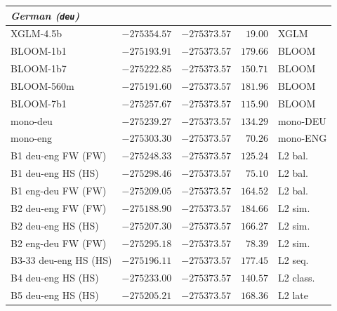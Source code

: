 \begin{table}[t]
\begin{tabular}{lrrrl}
    \midrule
    \multicolumn{5}{l}{\textit{German (\texttt{deu})}} \\
    \midrule
    XGLM-4.5b & $-275354.57$ & $-275373.57$ & $19.00$ & XGLM \\
    BLOOM-1b1 & $-275193.91$ & $-275373.57$ & $179.66$ & BLOOM \\
    BLOOM-1b7 & $-275222.85$ & $-275373.57$ & $150.71$ & BLOOM \\
    BLOOM-560m & $-275191.60$ & $-275373.57$ & $181.96$ & BLOOM \\
    BLOOM-7b1 & $-275257.67$ & $-275373.57$ & $115.90$ & BLOOM \\
    mono-deu & $-275239.27$ & $-275373.57$ & $134.29$ & mono-DEU \\
    mono-eng & $-275303.30$ & $-275373.57$ & $70.26$ & mono-ENG \\
    B1 deu-eng FW (FW) & $-275248.33$ & $-275373.57$ & $125.24$ & L2 bal. \\
    B1 deu-eng HS (HS) & $-275298.46$ & $-275373.57$ & $75.10$ & L2 bal. \\
    B1 eng-deu FW (FW) & $-275209.05$ & $-275373.57$ & $164.52$ & L2 bal. \\
    B2 deu-eng FW (FW) & $-275188.90$ & $-275373.57$ & $184.66$ & L2 sim. \\
    B2 deu-eng HS (HS) & $-275207.30$ & $-275373.57$ & $166.27$ & L2 sim. \\
    B2 eng-deu FW (FW) & $-275295.18$ & $-275373.57$ & $78.39$ & L2 sim. \\
    B3-33 deu-eng HS (HS) & $-275196.11$ & $-275373.57$ & $177.45$ & L2 seq. \\
    B4 deu-eng HS (HS) & $-275233.00$ & $-275373.57$ & $140.57$ & L2 class. \\
    B5 deu-eng HS (HS) & $-275205.21$ & $-275373.57$ & $168.36$ & L2 late \\
    \bottomrule
  \end{tabular}
\end{table}




